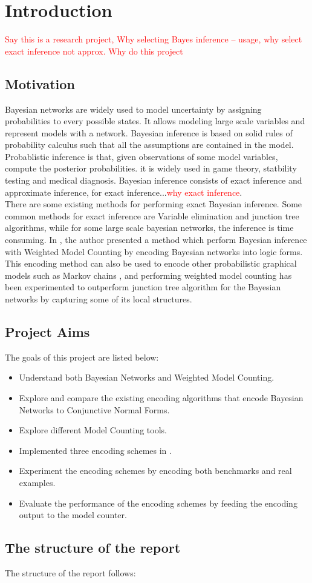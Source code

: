 
\section{Introduction}
\textcolor{red}{Say this is a research project, Why selecting Bayes inference -- usage, why select exact inference not approx. Why do this project}
    \subsection{Motivation}
    Bayesian networks are widely used to model uncertainty by assigning probabilities to every possible states. It allows modeling large scale variables and represent models with a network.
    Bayesian inference is based on solid rules of probability calculus such that all the assumptions are contained in the model.
    Probablistic inference is that, given observations of some model variables, compute the posterior probabilities. it is widely used in game theory, statbility testing and medical diagnosis. 
    Bayesian inference consists of exact inference and approximate inference, for exact inference...\textcolor{red}{why exact inference}.\\
    \newline
    There are some existing methods for performing exact Bayesian inference. Some common methods for exact inference are Variable elimination and junction tree algorithms, while for some large scale bayesian networks, the inference is  time consuming. In \cite{enc1}, the author presented a method which perform Bayesian inference with Weighted Model Counting by encoding Bayesian networks into logic forms. This encoding method can also be used to encode other probabilistic graphical models such as Markov chains \cite{2008-literature-review}, and performing weighted model counting has been experimented to outperform junction tree algorithm for the Bayesian networks by capturing some of its local structures.\par
    
    \subsection{Project Aims}
    The goals of this project are listed below:
    \begin{itemize}
        \item Understand both Bayesian Networks and Weighted Model Counting.
        \item Explore and compare the existing encoding algorithms that encode Bayesian Networks to Conjunctive Normal Forms.
        \item Explore different Model Counting tools.
        \item Implemented three encoding schemes in \cite{enc1,enc2,2006-enc3}.
        \item Experiment the encoding schemes by encoding both benchmarks and real examples.
        \item Evaluate the performance of the encoding schemes by feeding the encoding output to the model counter.
    \end{itemize}

    \subsection{The structure of the report}
    The structure of the report follows:


\newpage